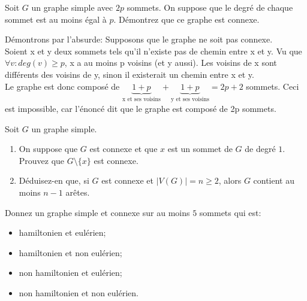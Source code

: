 
\begin{exo}
Soit $G$ un graphe simple avec $2p$ sommets. On suppose que le degr\'e de chaque sommet est au moins \'egal \`a $p$. D\'emontrez que ce graphe est connexe.
\end{exo}

Démontrons par l'absurde: Supposons que le graphe ne soit pas connexe.\\

Soient x et y deux sommets tels qu'il n'existe pas de chemin entre x et y. Vu que $\forall v: deg(v)\geq p$, x a au moins p voisins (et y aussi). Les voisins de x sont différents des voisins de y, sinon il existerait un chemin entre x et y.\\

Le graphe est donc composé de $\underbrace{1+p}_{\text{x et ses voisins}}+\underbrace{1+p}_{\text{y et ses voisins}} = 2p+2$ sommets. Ceci est impossible, car l'énoncé dit que le graphe est composé de 2p sommets.


\begin{exo}
Soit $G$ un graphe simple.
\begin{enumerate}
\item On suppose que $G$ est connexe et que $x$ est un sommet de $G$ de degr\'e $1$. Prouvez que $G\setminus\{x\}$ est connexe.
\item D\'eduisez-en que, si $G$ est connexe et $|V(G)|=n\geq 2$, alors $G$ contient au moins $n-1$ ar\^etes.
\end{enumerate}
\end{exo}


\begin{exo}
Donnez un graphe simple et connexe sur au moins $5$ sommets qui est:
\begin{itemize}
\item hamiltonien et eul\'erien;
\item hamiltonien et non eul\'erien;
\item non hamiltonien et eul\'erien;
\item non hamiltonien et non eul\'erien.
\end{itemize}
\end{exo}


